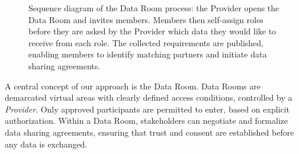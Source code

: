 \begin{figure}[t]
\caption{Sequence diagram of the Data Room process: the Provider opens the Data Room and invites members. Members then self-assign roles before they are asked by the Provider which data they would like to receive from each role. The collected requirements are published, enabling members to identify matching partners and initiate data sharing agreements.}
\label{fig:dataroom-process}
\end{figure}

A central concept of our approach is the Data Room. Data Rooms are demarcated virtual areas with clearly defined access conditions, controlled by a \emph{Provider}. Only approved participants are permitted to enter, based on explicit authorization. Within a Data Room, stakeholders can negotiate and formalize data sharing agreements, ensuring that trust and consent are established before any data is exchanged.

